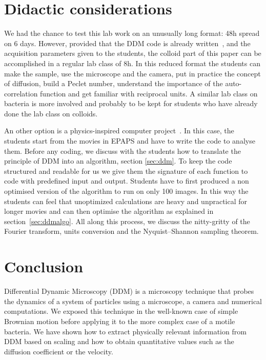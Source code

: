 \documentclass[prb,reprint,amsmath,amssymb]{revtex4-1}
\newcommand{\tg}[1]{{\color{magenta}#1}} %
\begin{document}
\section{\label{sec:didac}Didactic considerations}
\tg{We had the chance to test this lab work on an unusually long format: 48h spread on 6 days. However, provided that the DDM code is already written~\cite{code_github}, and the acquisition parameters given to the students, the colloid part of this paper can be accomplished in a regular lab class of 8h. In this reduced format the students can make the sample, use the microscope and the camera, put in practice the concept of diffusion, build a Peclet number, understand the importance of the auto-correlation function and get familiar with reciprocal units. A similar lab class on bacteria is more involved and probably to be kept for students who have already done the lab class on colloids.

An other option is a physics-inspired computer project~\cite{ajp2005spencer, ajp2014deutsh}. In this case, the students start from the movies in EPAPS and have to write the code to analyse them. Before any coding, we discuss with the students how to translate the principle of DDM into an algorithm, section \ref{sec:ddm}. To keep the code structured and readable for us we give them the signature of each function to code with predefined input and output. Students have to first produced a non optimised version of the algorithm to run on only 100 images. In this way the students can feel that unoptimized  calculations are heavy and unpractical for longer movies and can then optimise the algorithm as explained in section~\ref{sec:ddmalgo}. All along this process, we discuss the nitty-gritty of the Fourier transform, units conversion and the Nyquist–Shannon sampling theorem.}




\section{\label{sec:cl}Conclusion}

Differential Dynamic Microscopy (DDM) is a microscopy technique that probes the dynamics of a system of particles using a microscope, a camera and numerical computations. We exposed this technique in the well-known case of simple Brownian motion before applying it to the more complex case of a motile bacteria. We have shown how to extract physically relevant information from DDM based on scaling and how to obtain quantitative values such as the diffusion coefficient or the velocity.
\end{document}

